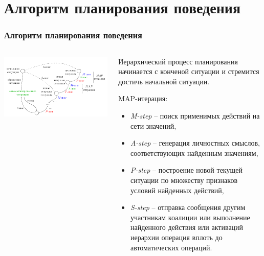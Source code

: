\documentclass[default]{beamer}
\begin{document}
	\section{Алгоритм планирования поведения}
	\begin{frame}
		\frametitle{Алгоритм планирования поведения}
		
		\begin{columns}
			\begin{column}{0.6\textwidth}
				\includegraphics[width=\textwidth]{algo/ru/beh_plan2_ru}
				\vspace{20pt}
				\nocite{*}
				\printbibliography[keyword={plan}, resetnumbers=true]
			\end{column}
			\begin{column}{0.4\textwidth}
				\scriptsize
				Иерархический процесс планирования начинается с конченой ситуации и стремится достичь начальной ситуации.
				\par\bigskip
				MAP-итерация:
				\begin{itemize}
					\item \textit{M-step} -- поиск применимых действий на сети значений,
					\item \textit{A-step} -- генерация личностных смыслов, соответствующих найденным значениям,
					\item \textit{P-step} -- построение новой текущей ситуации по множеству признаков условий найденных действий,
					\item \textit{S-step} -- отправка сообщения другим участникам коалиции или выполнение найденного действия или активаций иерархии операция вплоть до автоматических операций.
				\end{itemize}
			\end{column}
		\end{columns}
		
	\end{frame}	
\end{document}
